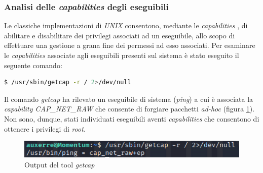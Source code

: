 \subsubsection{Analisi delle \emph{capabilities} degli eseguibili} 
Le classiche implementazioni di \emph{UNIX} consentono, mediante le \emph{capabilities} \cite{capabilities}, di abilitare e disabilitare dei privilegi associati ad un eseguibile, allo scopo di effettuare una gestione a grana fine dei permessi ad esso associati. Per esaminare le \emph{capabilities} associate agli eseguibili presenti sul sistema è stato eseguito il seguente comando:
\begin{lstlisting}[language=bash]
    $ /usr/sbin/getcap -r / 2>/dev/null
\end{lstlisting}
Il comando \emph{getcap} ha rilevato un eseguibile di sistema (\emph{ping}) a cui è associata la \emph{capability CAP\_NET\_RAW} che consente di forgiare pacchetti \emph{ad-hoc} (figura \ref{fig:getcap}). Non sono, dunque, stati individuati eseguibili aventi \emph{capabilities} che consentono di ottenere i privilegi di \emph{root}.
\begin{figure}[h]
    \centering
    \includegraphics[scale=1]{capitoli/images/getcap.png}
    \caption{Output del tool \emph{getcap}}
    \label{fig:getcap}
\end{figure}

